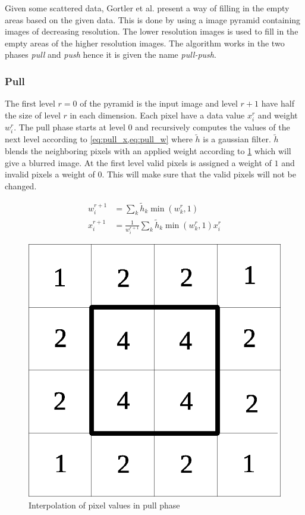 Given some scattered data, Gortler et al. \cite{Gortler96thelumigraph} present a way of filling in the empty areas based on the given data. This is done by using a image pyramid containing images of decreasing resolution. The lower resolution images is used to fill in the empty areas of the higher resolution images. The algorithm works in the two phases \emph{pull} and \emph{push} hence it is given the name \emph{pull-push}.

\begin{subs}
\subsubsection{Pull}
The first level $r = 0$ of the pyramid is the input image and level $r + 1$ have half the size of level $r$ in each dimension. Each pixel have a data value $x^r_i$ and weight $w^r_i$. The pull phase starts at level 0 and recursively computes the values of the next level according to \cref{eq:pull_x,eq:pull_w} where $\tilde{h}$ is a gaussian filter. $\tilde{h}$ blends the neighboring pixels with an applied weight according to \cref{fig:pull_filter} which will give a blurred image. At the first level valid pixels is assigned a weight of $1$ and invalid pixels a weight of $0$. This will make sure that the valid pixels will not be changed.

\begin{align}
  w^{r+1}_i &= \sum_k {\tilde{h}_k \min(w^r_k,1)} \label{eq:pull_x}\\
  x^{r+1}_i &= \frac{1}{w^{r+1}_i} \sum_k {\tilde{h}_k \min(w^r_k,1) x^r_i} \label{eq:pull_w}
\end{align}



\begin{figure}[h]
    \centering
    \includegraphics[width=.3\textwidth]{figures/pull_filter.eps}
    \caption{Interpolation of pixel values in pull phase}
    \label{fig:pull_filter}
\end{figure}
\end{subs}

